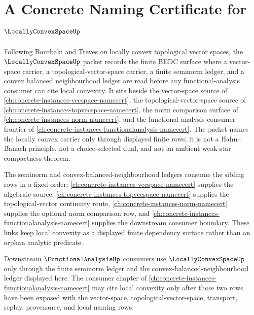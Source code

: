 \chapter{A Concrete Naming Certificate for $\LocallyConvexSpaceUp$}
\label{ch:concrete-instances-locally-convex-space-namecert}

Following Bourbaki and Treves on locally convex topological vector spaces, the $\LocallyConvexSpaceUp$ packet records the finite BEDC surface where a vector-space carrier, a topological-vector-space carrier, a finite seminorm ledger, and a convex balanced neighbourhood ledger are read before any functional-analysis consumer can cite local convexity. It sits beside the vector-space source of \autoref{ch:concrete-instances-vecspace-namecert}, the topological-vector-space source of \autoref{ch:concrete-instances-topvecspace-namecert}, the norm comparison surface of \autoref{ch:concrete-instances-norm-namecert}, and the functional-analysis consumer frontier of \autoref{ch:concrete-instances-functionalanalysis-namecert}. The packet names the locally convex carrier only through displayed finite rows; it is not a Hahn--Banach principle, not a choice-selected dual, and not an ambient weak-star compactness theorem.

The seminorm and convex-balanced-neighbourhood ledgers consume the sibling rows in a fixed order: \autoref{ch:concrete-instances-vecspace-namecert} supplies the algebraic source, \autoref{ch:concrete-instances-topvecspace-namecert} supplies the topological-vector continuity route, \autoref{ch:concrete-instances-norm-namecert} supplies the optional norm comparison row, and \autoref{ch:concrete-instances-functionalanalysis-namecert} supplies the downstream consumer boundary. These links keep local convexity as a displayed finite dependency surface rather than an orphan analytic predicate.

Downstream $\FunctionalAnalysisUp$ consumers use $\LocallyConvexSpaceUp$ only through the finite seminorm ledger and the convex-balanced-neighbourhood ledger displayed here. The consumer chapter of \autoref{ch:concrete-instances-functionalanalysis-namecert} may cite local convexity only after those two rows have been exposed with the vector-space, topological-vector-space, transport, replay, provenance, and local naming rows.

